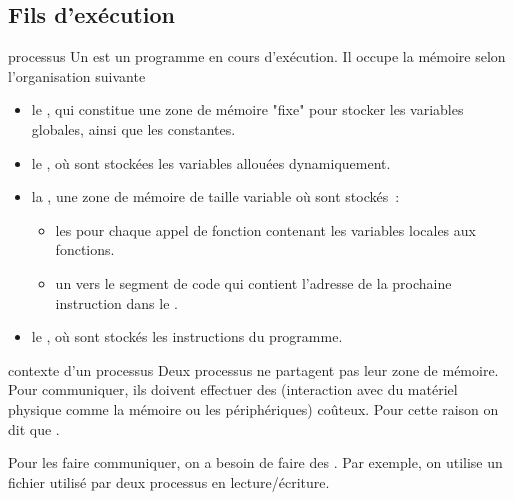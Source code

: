 

\begin{adjustwidth}{-3cm}{-3cm}

\setcounter{chapitre}{8}

\section{Fils d'exécution}

\begin{definition}{}{processus}
    Un  est un programme en cours d'exécution. Il occupe la mémoire selon l'organisation suivante~
    \begin{itemize}
        \item le , qui constitue une zone de mémoire "fixe" pour stocker les variables globales, ainsi que les constantes.
        \item le , où sont stockées les variables allouées dynamiquement.
        \item la , une zone de mémoire de taille variable où sont stockés~:
        \begin{itemize}
            \item les  pour chaque appel de fonction contenant les variables locales aux fonctions.
            \item un  vers le segment de code qui contient l'adresse de la prochaine instruction dans le .
        \end{itemize}
        \item le , où sont stockés les instructions du programme.
    \end{itemize}
\end{definition}

\begin{remarque}{}{contexte d'un processus}
    Deux processus ne partagent pas leur zone de mémoire. Pour communiquer, ils doivent effectuer des  (interaction avec du matériel physique comme la mémoire ou les périphériques) coûteux. Pour cette raison on dit que .
\end{remarque}

\begin{remarque}{}{}
    Pour les faire communiquer, on a besoin de faire des . Par exemple, on utilise un fichier utilisé par deux processus en lecture/écriture.
\end{remarque}


\end{adjustwidth}
